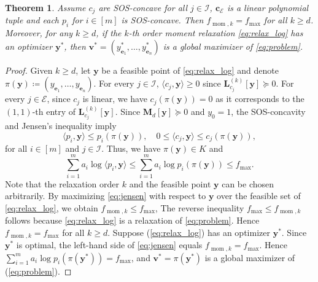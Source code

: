 \documentclass[pdflatex,sn-mathphys-num]{sn-jnl}%
\newcommand{\reff}[1]{(\ref{#1})}
\newcommand{\rd}[1]{{\color{red}#1}}
\newcommand{\vect}[1]{\boldsymbol{#1}}
\newcommand{\mat}[1]{\boldsymbol{#1}}
\newcommand{\ddd}{,\ldots,}
\theoremstyle{thmstyleone}%
\newtheorem{theorem}{Theorem}%
\theoremstyle{thmstyletwo}%
\theoremstyle{thmstylethree}%
\begin{document}
\begin{theorem}\label{thm:sosconcave}
	Assume $c_j$ are SOS-concave for all $j\in\mathcal{I}$, 
	$\vect{c}_{\mathcal{E}}$ is a linear polynomial tuple and 
	each $p_i$ for $i\in[m]$ is SOS-concave.
	Then $f_{\operatorname{mom},k} = f_{\max}$ for all $k\ge d$.
	\rd{Moreover, for any $k\geq d$, if the $k$-th order moment
	relaxation \eqref{eq:relax_log} has an optimizer $\vect{y}^*$,}
	then $\vect{v}^* = (y^*_{\vect{e}_1}\ddd y^*_{\vect{e}_n})$
	is a global maximizer of \eqref{eq:problem}.
\end{theorem}

\begin{proof} 
	Given $k\ge d$, let $\vect{y}$ be a feasible point of \eqref{eq:relax_log}
	and denote $\pi(\vect{y})\coloneqq (y_{\vect{e}_1}\ddd y_{\vect{e}_n})$.
	For every $j\in \mathcal{I}$, $\langle c_j,\vect{y}\rangle \ge 0$ 
	since $\mat{L}_{c_j}^{(k)}[\vect{y}]\succeq 0$.
	For every $j\in \mathcal{E}$, since $c_j$ is linear, 
	we have $c_j(\pi(\vect{y})) = 0$ as it corresponds to the 
	$(1,1)$-th entry of $\mat{L}_{c_j}^{(k)}[\vect{y}]$.
	Since $\mat{M}_d[\vect{y}]\succeq 0$ and $y_0=1$, 
	the SOS-concavity and Jensen's inequality \cite[Theorem~7.1.6]{MPO} imply
	\[ 
	\langle p_i,\vect{y}\rangle \le p_i(\pi(\vect{y})),\quad 0
	\le \langle c_j,\vect{y}\rangle \le c_j(\pi(\vect{y})), 
	\]
	for all $i\in[m]$ and $j\in \mathcal{I}$. 
	Thus, we have $\pi(\vect{y})\in K$ and
	\begin{equation}\label{eq:jensen}
		\sum\limits_{i=1}^m a_i \log \langle p_i,\vect{y}\rangle  
		\le  \sum\limits_{i=1}^m a_i \log p_i(\pi(\vect{y})) 
		\leq  f_{\max}.
	\end{equation}
	Note that the relaxation order $k$ and the 
	feasible point $\vect{y}$ can be chosen arbitrarily.
	By maximizing \eqref{eq:jensen} with respect to $\vect{y}$ 
	over the feasible set of \eqref{eq:relax_log}, 
	we obtain $f_{\operatorname{mom},k} \le f_{\max}$, 
	The reverse inequality
	$f_{\max}\leq f_{\operatorname{mom},k}$ follows because
	\eqref{eq:relax_log} is a relaxation of \eqref{eq:problem}.
	Hence $f_{\operatorname{mom},k}=f_{\max}$ for all $k\geq d$.
	Suppose \reff{eq:relax_log} has an optimizer $\vect{y}^*$. 
    Since $\vect{y}^*$ is optimal, the left-hand side of \eqref{eq:jensen} equals
    $f_{\operatorname{mom},k}=f_{\max}$.
    Hence $\sum_{i=1}^m a_i \log p_i(\pi(\vect{y}^*))=f_{\max}$, and $\vect{v}^*=\pi(\vect{y}^*)$ is a global maximizer of \reff{eq:problem}. 
\end{proof}
\end{document}
